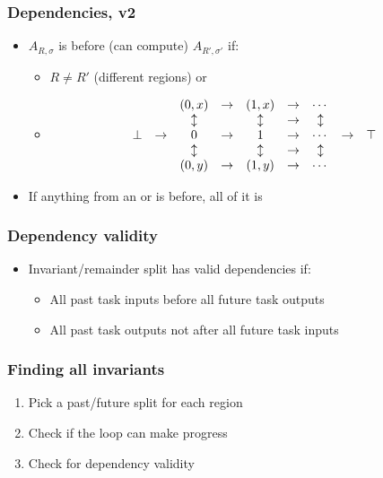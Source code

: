\documentclass{beamer}
\begin{document}
\begin{frame}
  \frametitle{Dependencies, v2}
  \begin{itemize}
  \item $A_{R, \sigma}$ is before (can compute) $A_{R', \sigma'}$ if:
    \begin{itemize}
    \item $R \neq R'$ (different regions) or
    \item
      \begin{equation*}
        \begin{array}{c c c c c c c c c}
           & &(0, x)&\to&(1, x)&\to&\cdots& &\\
           & &\updownarrow     & &\updownarrow     &\to&\updownarrow& &\\
          \bot&\to&0     &\to&1     &\to&\cdots&\to&\top\\
           & &\updownarrow     & &\updownarrow     &\to&\updownarrow& &\\
           & &(0, y)&\to&(1, y)&\to&\cdots& &\\
        \end{array}
      \end{equation*}
    \end{itemize}
  \item If anything from an or is before, all of it is
  \end{itemize}
\end{frame}

\begin{frame}
  \frametitle{Dependency validity}
  \begin{itemize}
  \item Invariant/remainder split has valid dependencies if:
    \begin{itemize}
    \item All past task inputs before all future task outputs
    \item All past task outputs not after all future task inputs
    \end{itemize}
  \end{itemize}
\end{frame}

\begin{frame}
  \frametitle{Finding all invariants}
  \begin{enumerate}
  \item Pick a past/future split for each region
  \item Check if the loop can make progress
  \item Check for dependency validity
  \end{enumerate}
\end{frame}
\end{document}
